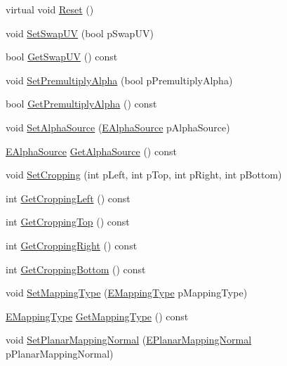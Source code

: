 \begin{DoxyCompactItemize}
\item 
virtual void \hyperlink{class_fbx_texture_a9ba254e02e13f1cae91295c996ed7fcb}{Reset} ()
\item 
void \hyperlink{class_fbx_texture_a29d8e8398ff2280af91b4fbd15a4647a}{Set\+Swap\+UV} (bool p\+Swap\+UV)
\item 
bool \hyperlink{class_fbx_texture_ac73ac8fda4d8e4e31c829ffb6838fcad}{Get\+Swap\+UV} () const
\item 
void \hyperlink{class_fbx_texture_af244c477cedbba956106e03aca85867f}{Set\+Premultiply\+Alpha} (bool p\+Premultiply\+Alpha)
\item 
bool \hyperlink{class_fbx_texture_a92ffecbc95b53e3b410a2cee81b434dc}{Get\+Premultiply\+Alpha} () const
\item 
void \hyperlink{class_fbx_texture_a45bc6bb0c52b4eea53a4bc1c9c3a699c}{Set\+Alpha\+Source} (\hyperlink{class_fbx_texture_a12777ea406718d186e21b9656716171d}{E\+Alpha\+Source} p\+Alpha\+Source)
\item 
\hyperlink{class_fbx_texture_a12777ea406718d186e21b9656716171d}{E\+Alpha\+Source} \hyperlink{class_fbx_texture_a6ca527821cb9e95af5376e7bb2979deb}{Get\+Alpha\+Source} () const
\item 
void \hyperlink{class_fbx_texture_a8466d23b8049dca1175c24ca4e209f47}{Set\+Cropping} (int p\+Left, int p\+Top, int p\+Right, int p\+Bottom)
\item 
int \hyperlink{class_fbx_texture_a8f8e8e8f645cc8cd3f3fabae7e5b6c44}{Get\+Cropping\+Left} () const
\item 
int \hyperlink{class_fbx_texture_a1033fe7ba0df6166e17a49d095518c25}{Get\+Cropping\+Top} () const
\item 
int \hyperlink{class_fbx_texture_a4acabeab1c1c4fe031bbd8bd9ace3c64}{Get\+Cropping\+Right} () const
\item 
int \hyperlink{class_fbx_texture_a12ee7e2132ce572b439b73de858f4f6c}{Get\+Cropping\+Bottom} () const
\item 
void \hyperlink{class_fbx_texture_a8b71add5498dc0f8a9aa4af87cccb5da}{Set\+Mapping\+Type} (\hyperlink{class_fbx_texture_afdf9b65a25dfe5bdcef820f0fc1f5b34}{E\+Mapping\+Type} p\+Mapping\+Type)
\item 
\hyperlink{class_fbx_texture_afdf9b65a25dfe5bdcef820f0fc1f5b34}{E\+Mapping\+Type} \hyperlink{class_fbx_texture_a622d8acfcb6b7ff965079294ef8d23c6}{Get\+Mapping\+Type} () const
\item 
void \hyperlink{class_fbx_texture_a5f23cc30b768e4967d35064b39b9958f}{Set\+Planar\+Mapping\+Normal} (\hyperlink{class_fbx_texture_a6115b6970e4c83198112530d1e6f578c}{E\+Planar\+Mapping\+Normal} p\+Planar\+Mapping\+Normal)

\end{DoxyCompactItemize}
